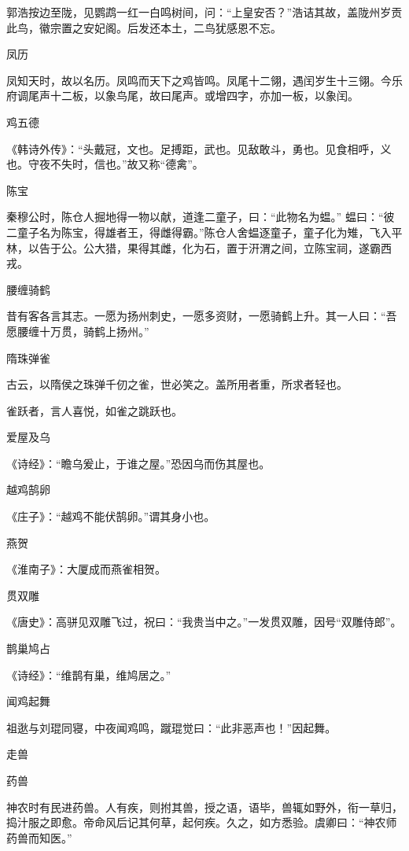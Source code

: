 \documentclass[a4paper,12pt,UTF8,twoside]{ctexbook}
\begin{document}
    郭浩按边至陇，见鹦鹉一红一白鸣树间，问：“上皇安否？”浩诘其故，盖陇州岁贡此鸟，徽宗置之安妃阁。后发还本土，二鸟犹感恩不忘。
    
    凤历
    
    凤知天时，故以名历。凤鸣而天下之鸡皆鸣。凤尾十二翎，遇闰岁生十三翎。今乐府调尾声十二板，以象鸟尾，故曰尾声。或增四字，亦加一板，以象闰。
    
    鸡五德
    
    《韩诗外传》：“头戴冠，文也。足搏距，武也。见敌敢斗，勇也。见食相呼，义也。守夜不失时，信也。”故又称“德禽”。
    
    陈宝
    
    秦穆公时，陈仓人掘地得一物以献，道逢二童子，曰：“此物名为蝹。” 蝹曰：“彼二童子名为陈宝，得雄者王，得雌得霸。”陈仓人舍蝹逐童子，童子化为雉，飞入平林，以告于公。公大猎，果得其雌，化为石，置于汧渭之间，立陈宝祠，遂霸西戎。
    
    腰缠骑鹤
    
    昔有客各言其志。一愿为扬州刺史，一愿多资财，一愿骑鹤上升。其一人曰：“吾愿腰缠十万贯，骑鹤上扬州。”
    
    隋珠弹雀
    
    古云，以隋侯之珠弹千仞之雀，世必笑之。盖所用者重，所求者轻也。
    
    雀跃者，言人喜悦，如雀之跳跃也。
    
    爱屋及乌
    
    《诗经》：“瞻乌爰止，于谁之屋。”恐因乌而伤其屋也。
    
    越鸡鹄卵
    
    《庄子》：“越鸡不能伏鹄卵。”谓其身小也。
    
    燕贺
    
    《淮南子》：大厦成而燕雀相贺。
    
    贯双雕
    
    《唐史》：高骈见双雕飞过，祝曰：“我贵当中之。”一发贯双雕，因号“双雕侍郎”。
    
    鹊巢鸠占
    
    《诗经》：“维鹊有巢，维鸠居之。”
    
    闻鸡起舞
    
    祖逖与刘琨同寝，中夜闻鸡鸣，蹴琨觉曰：“此非恶声也！”因起舞。
    
    走兽
    
    药兽
    
    神农时有民进药兽。人有疾，则拊其兽，授之语，语毕，兽辄如野外，衔一草归，捣汁服之即愈。帝命风后记其何草，起何疾。久之，如方悉验。虞卿曰：“神农师药兽而知医。”
    
\end{document}
